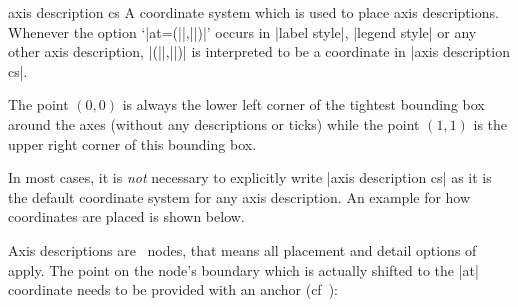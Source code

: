 \begin{coordinatesystem}{axis description cs}
\label{pgfplots:sec:axis:description:cs}
	A coordinate system which is used to place axis descriptions. Whenever the option `|at={(||,||)}|' occurs in |label style|, |legend style| or any other axis description, |(||,||)| is interpreted to be a coordinate in |axis description cs|.

	The point $(0,0)$ is always the lower left corner of the tightest bounding box around the axes (without any descriptions or ticks) while the point $(1,1)$ is the upper right corner of this bounding box.

	In most cases, it is \emph{not} necessary to explicitly write |axis description cs| as it is the default coordinate system for any axis description. An example for how coordinates are placed is shown below.
	
\begin{codeexample}[width=4cm]
\end{codeexample}

Axis descriptions are \Tikz\ nodes, that means all placement and detail options of \cite{tikz} apply. The point on the node's boundary which is actually shifted to the |at| coordinate needs to be provided with an anchor (cf~\cite[Nodes and Edges]{tikz}):
\begin{codeexample}[]
\end{codeexample}
	

\end{coordinatesystem}
